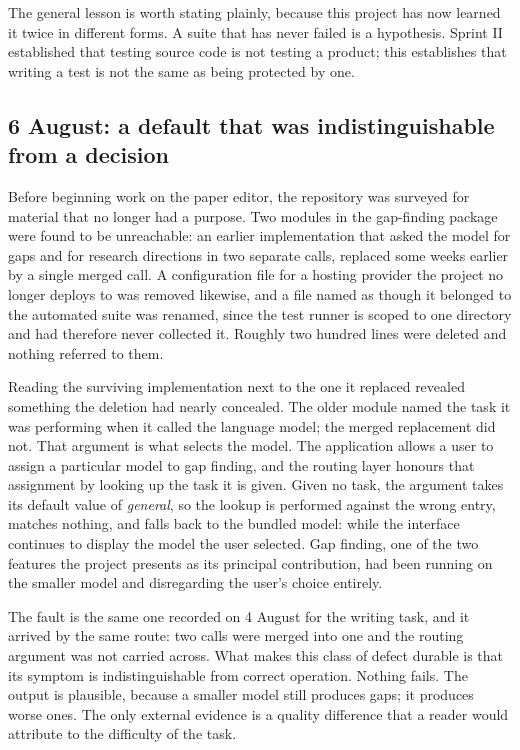 \documentclass[11pt,a4paper]{article}
\begin{document}
The general lesson is worth stating plainly, because this project has now
learned it twice in different forms. A suite that has never failed is a
hypothesis. Sprint II established that testing source code is not testing a
product; this establishes that writing a test is not the same as being
protected by one.


\subsection{6 August: a default that was indistinguishable from a decision}

Before beginning work on the paper editor, the repository was surveyed for
material that no longer had a purpose. Two modules in the gap-finding package
were found to be unreachable: an earlier implementation that asked the model for
gaps and for research directions in two separate calls, replaced some weeks
earlier by a single merged call. A configuration file for a hosting provider the
project no longer deploys to was removed likewise, and a file named as though it
belonged to the automated suite was renamed, since the test runner is scoped to
one directory and had therefore never collected it. Roughly two hundred lines
were deleted and nothing referred to them.

Reading the surviving implementation next to the one it replaced revealed
something the deletion had nearly concealed. The older module named the task it
was performing when it called the language model; the merged replacement did
not. That argument is what selects the model. The application allows a user to
assign a particular model to gap finding, and the routing layer honours that
assignment by looking up the task it is given. Given no task, the argument takes
its default value of \emph{general}, so the lookup is performed against the
wrong entry, matches nothing, and falls back to the bundled model: while the
interface continues to display the model the user selected. Gap finding, one of
the two features the project presents as its principal contribution, had been
running on the smaller model and disregarding the user's choice entirely.

The fault is the same one recorded on 4 August for the writing task, and it
arrived by the same route: two calls were merged into one and the routing
argument was not carried across. What makes this class of defect durable is that
its symptom is indistinguishable from correct operation. Nothing fails. The
output is plausible, because a smaller model still produces gaps; it produces
worse ones. The only external evidence is a quality difference that a reader
would attribute to the difficulty of the task.
\end{document}
